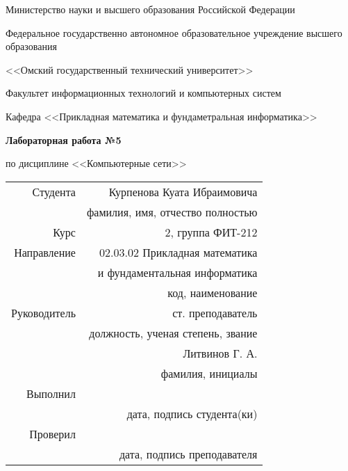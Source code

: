 \documentclass[14pt, a4paper]{article}
\begin{document}
    \thispagestyle{empty}

    \begin{center}
        Министерство науки и высшего образования Российской Федерации

        Федеральное государственно автономное образовательное учреждение высшего образования

        <<Омский государственный технический университет>>

        \vspace{1cm}
        Факультет информационных технологий и компьютерных систем

        Кафедра <<Прикладная математика и фундаметральная информатика>>

        \vspace{3cm}
        \textbf{Лабораторная работа №5}

        по дисциплине <<Компьютерные сети>>
    \end{center}
    
    \vspace{3cm}
    \begin{flushright}    
        \begin{tabular}{ r r }
            Студента & Курпенова Куата Ибраимовича \\
            \cline{2-2}
            & \tiny{фамилия, имя, отчество полностью} \\

            Курс & 2, группа ФИТ-212 \\
            \cline{2-2}
            Направление & 02.03.02 Прикладная математика \\
            \cline{2-2}
            & и фундаментальная информатика \\
            \cline{2-2}
            & \tiny{код, наименование} \\
            
            Руководитель & ст. преподаватель \\
            \cline{2-2}
            & \tiny{должность, ученая степень, звание} \\
            & Литвинов Г. А. \\
            \cline{2-2}
            & \tiny{фамилия, инициалы} \\
            
            Выполнил & \\
            \cline{2-2}
            & \tiny{дата, подпись студента(ки)} \\

            Проверил & \\
            \cline{2-2}
            & \tiny{дата, подпись преподавателя} \\
        \end{tabular}
    \end{flushright}
    
\end{document}
